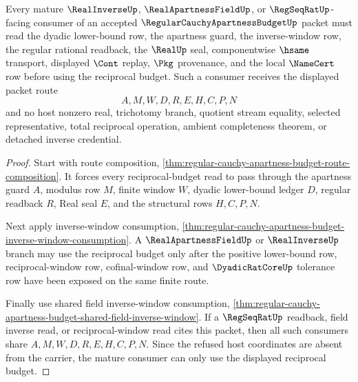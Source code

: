 \begin{theorem}
\label{thm:regular-cauchy-apartness-budget-mature-consumer}
Every mature $\RealInverseUp$, $\RealApartnessFieldUp$, or $\RegSeqRatUp$-facing consumer of an accepted $\RegularCauchyApartnessBudgetUp$ packet must read the dyadic lower-bound row, the apartness guard, the inverse-window row, the regular rational readback, the $\RealUp$ seal, componentwise $\hsame$ transport, displayed $\Cont$ replay, $\Pkg$ provenance, and the local $\NameCert$ row before using the reciprocal budget. Such a consumer receives the displayed packet route
$$
A,M,W,D,R,E,H,C,P,N
$$
and no host nonzero real, trichotomy branch, quotient stream equality, selected representative, total reciprocal operation, ambient completeness theorem, or detached inverse credential.
\end{theorem}
\begin{proof}
Start with route composition, \autoref{thm:regular-cauchy-apartness-budget-route-composition}. It forces every reciprocal-budget read to pass through the apartness guard $A$, modulus row $M$, finite window $W$, dyadic lower-bound ledger $D$, regular readback $R$, Real seal $E$, and the structural rows $H,C,P,N$.

Next apply inverse-window consumption, \autoref{thm:regular-cauchy-apartness-budget-inverse-window-consumption}. A $\RealApartnessFieldUp$ or $\RealInverseUp$ branch may use the reciprocal budget only after the positive lower-bound row, reciprocal-window row, cofinal-window row, and $\DyadicRatCoreUp$ tolerance row have been exposed on the same finite route.

Finally use shared field inverse-window consumption, \autoref{thm:regular-cauchy-apartness-budget-shared-field-inverse-window}. If a $\RegSeqRatUp$ readback, field inverse read, or reciprocal-window read cites this packet, then all such consumers share $A,M,W,D,R,E,H,C,P,N$. Since the refused host coordinates are absent from the carrier, the mature consumer can only use the displayed reciprocal budget.
\end{proof}

